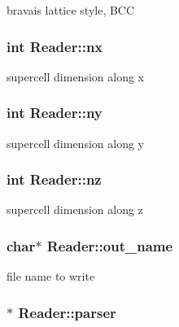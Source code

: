 bravais lattice style, B\+C\+C 

\hypertarget{class_reader_a85d35ff338db8e5915d7620a730df6fb}{}
\subsubsection[{nx}]{\setlength{\rightskip}{0pt plus 5cm}int Reader\+::nx}\label{class_reader_a85d35ff338db8e5915d7620a730df6fb}


supercell dimension along x 

\hypertarget{class_reader_a68ce806c514dd9323b66de3ca25285c2}{}
\subsubsection[{ny}]{\setlength{\rightskip}{0pt plus 5cm}int Reader\+::ny}\label{class_reader_a68ce806c514dd9323b66de3ca25285c2}


supercell dimension along y 

\hypertarget{class_reader_ab09026e1e834afa843386f8da4f3e5d3}{}
\subsubsection[{nz}]{\setlength{\rightskip}{0pt plus 5cm}int Reader\+::nz}\label{class_reader_ab09026e1e834afa843386f8da4f3e5d3}


supercell dimension along z 

\hypertarget{class_reader_a05d97010d814f91cffe66657e2c39ffd}{}
\subsubsection[{out\+\_\+name}]{\setlength{\rightskip}{0pt plus 5cm}char$\ast$ Reader\+::out\+\_\+name}\label{class_reader_a05d97010d814f91cffe66657e2c39ffd}


file name to write 

\hypertarget{class_reader_a4a2ce1dccacd1cb00f0a226f4f78c9d6}{}
\subsubsection[{parser}]{$\ast$ Reader\+::parser}\label{class_reader_a4a2ce1dccacd1cb00f0a226f4f78c9d6}
\hypertarget{class_reader_aa1f260272da17a496f1ecd3ce39281b9}{}
